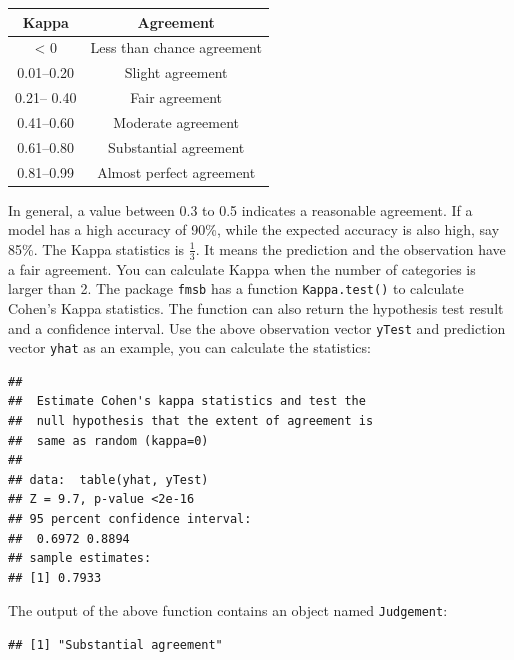 \documentclass[12pt,]{krantz}
\makeatletter
\newenvironment{Shaded}{\begin{snugshade}}{\end{snugshade}}
\newcommand{\CommentTok}[1]{\textcolor[rgb]{0.37,0.37,0.37}{\textit{#1}}}
\newcommand{\KeywordTok}[1]{\textcolor[rgb]{0.27,0.27,0.27}{\textbf{#1}}}
\newcommand{\NormalTok}[1]{#1}
\newcommand{\OperatorTok}[1]{\textcolor[rgb]{0.43,0.43,0.43}{\textbf{#1}}}
\newenvironment{kframe}{%
\medskip{}
\setlength{\fboxsep}{.8em}
 \def\at@end@of@kframe{}%
 \ifinner\ifhmode%
  \def\at@end@of@kframe{\end{minipage}}%
  \begin{minipage}{\columnwidth}%
 \fi\fi%
 \def\FrameCommand##1{\hskip\@totalleftmargin \hskip-\fboxsep
 \colorbox{shadecolor}{##1}\hskip-\fboxsep
     \hskip-\linewidth \hskip-\@totalleftmargin \hskip\columnwidth}%
 \MakeFramed {\advance\hsize-\width
   \@totalleftmargin\z@ \linewidth\hsize
   \@setminipage}}%
 {\par\unskip\endMakeFramed%
 \at@end@of@kframe}
\renewenvironment{Shaded}{\begin{kframe}}{\end{kframe}}
\makeatother
\begin{document}
\begin{longtable}[]{@{}cc@{}}
\toprule
Kappa & Agreement\tabularnewline
\midrule
\endhead
\textless{} 0 & Less than chance agreement\tabularnewline
0.01--0.20 & Slight agreement\tabularnewline
0.21-- 0.40 & Fair agreement\tabularnewline
0.41--0.60 & Moderate agreement\tabularnewline
0.61--0.80 & Substantial agreement\tabularnewline
0.81--0.99 & Almost perfect agreement\tabularnewline
\bottomrule
\end{longtable}

In general, a value between 0.3 to 0.5 indicates a reasonable agreement. If a model has a high accuracy of 90\%, while the expected accuracy is also high, say 85\%. The Kappa statistics is \(\frac{1}{3}\). It means the prediction and the observation have a fair agreement. You can calculate Kappa when the number of categories is larger than 2. The package \texttt{fmsb} has a function \texttt{Kappa.test()} to calculate Cohen's Kappa statistics. The function can also return the hypothesis test result and a confidence interval. Use the above observation vector \texttt{yTest} and prediction vector \texttt{yhat} as an example, you can calculate the statistics:

\begin{Shaded}
\end{Shaded}

\begin{verbatim}
## 
## 	Estimate Cohen's kappa statistics and test the
## 	null hypothesis that the extent of agreement is
## 	same as random (kappa=0)
## 
## data:  table(yhat, yTest)
## Z = 9.7, p-value <2e-16
## 95 percent confidence interval:
##  0.6972 0.8894
## sample estimates:
## [1] 0.7933
\end{verbatim}

The output of the above function contains an object named \texttt{Judgement}:

\begin{Shaded}
\end{Shaded}

\begin{verbatim}
## [1] "Substantial agreement"
\end{verbatim}
\end{document}

